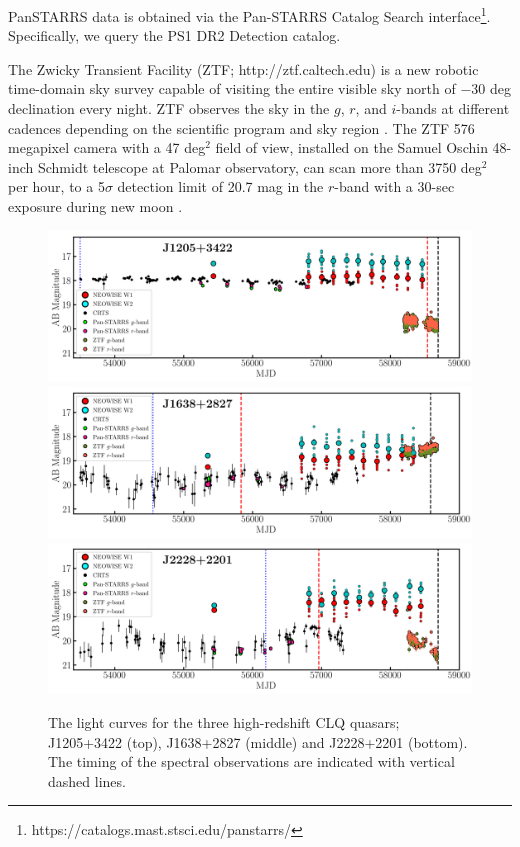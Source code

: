 \documentclass[fleqn,usenatbib]{mnras}
\begin{document}
PanSTARRS data is obtained via the Pan-STARRS Catalog Search
interface\footnote{https://catalogs.mast.stsci.edu/panstarrs/}.
Specifically, we query the PS1 DR2 Detection catalog.

The Zwicky Transient Facility (ZTF; http://ztf.caltech.edu) is a new
robotic time-domain sky survey capable of visiting the entire visible
sky north of $-$30 deg declination every night. ZTF observes the sky in
the $g$, $r$, and $i$-bands at different cadences depending on the
scientific program and sky region \citep{Bellm2019_ZTFSurveys,
Graham2019_ZTF}. The ZTF 576 megapixel camera with a 47 deg$^{2}$
field of view, installed on the Samuel Oschin 48-inch Schmidt
telescope at Palomar observatory, can scan more than 3750 deg$^{2}$
per hour, to a 5$\sigma$ detection limit of 20.7 mag in the $r$-band
with a 30-sec exposure during new moon \citep{Masci2019}.
\begin{figure}
  \centering
  \includegraphics[width=16.7cm, trim=0.3cm 0.05cm 0.20cm 0.1cm, clip]
  {figures/J1205+3422_landscape_LC.png}
  \includegraphics[width=16.7cm, trim=0.3cm 0.05cm 0.20cm 0.1cm, clip]
  {figures/J1638+2827_landscape_LC.png}
  \includegraphics[width=16.7cm, trim=0.3cm 0.0cm  0.20cm 0.1cm, clip]
  {figures/J2228+2201_landscape_LC.png}
  \vspace{-6pt}
  \caption[]{The light curves for the three high-redshift CLQ quasars; 
    J1205+3422 (top), 
    J1638+2827 (middle) and  
    J2228+2201 (bottom). 
    The timing of the spectral observations are indicated with vertical dashed lines.}
  \label{fig:civ_clqs_LCs}
\end{figure}
\end{document}
